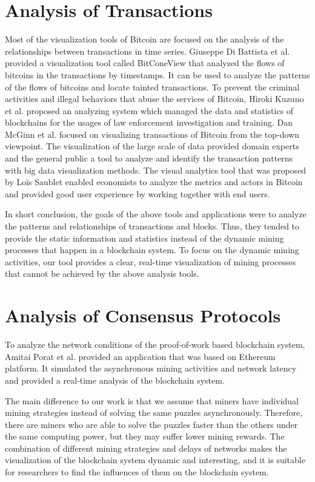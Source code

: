 \section{Analysis of Transactions}

Most of the visualization tools of Bitcoin are focused on the analysis of the relationships between transactions in time series. Giuseppe Di Battista et al. \cite{Battista2015} provided a visualization tool called BitConeView that analyzed the flows of bitcoins in the transactions by timestamps. It can be used to analyze the patterns of the flows of bitcoins and locate tainted transactions. To prevent the criminal activities and illegal behaviors that abuse the services of Bitcoin, Hiroki Kuzuno et al. \cite{Kuzuno2017} proposed an analyzing system which managed the data and statistics of blockchains for the usages of law enforcement investigation and training. Dan McGinn et al. \cite{McGinn2016} focused on visualizing transactions of Bitcoin from the top-down viewpoint. The visualization of the large scale of data provided domain experts and the general public a tool to analyze and identify the transaction patterns with big data visualization methods. The visual analytics tool that was proposed by Loïs Saublet \cite{Saublet2015} enabled economists to analyze the metrics and actors in Bitcoin and provided good user experience by working together with end users.



In short conclusion, the goals of the above tools and applications were to analyze the patterns and relationships of transactions and blocks. Thus, they tended to provide the static information and statistics instead of the dynamic mining processes that happen in a blockchain system. To focus on the dynamic mining activities, our tool provides a clear, real-time visualization of mining processes that cannot be achieved by the above analysis tools.

\section{Analysis of Consensus Protocols}

To analyze the network conditions of the proof-of-work based blockchain system, Amitai Porat et al. \cite{Porat} provided an application that was based on Ethereum platform. It simulated the asynchronous mining activities and network latency and provided a real-time analysis of the blockchain system.

The main difference to our work is that we assume that miners have individual mining strategies instead of solving the same puzzles asynchronously. Therefore, there are miners who are able to solve the puzzles faster than the others under the same computing power, but they may suffer lower mining rewards. The combination of different mining strategies and delays of networks makes the visualization of the blockchain system dynamic and interesting, and it is suitable for researchers to find the influences of them on the blockchain system.

